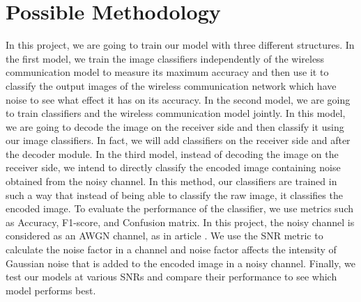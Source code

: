 \documentclass[10pt,twocolumn,letterpaper]{article}
\begin{document}
\section{Possible Methodology}
\label{sec:possiblemethodology}
In this project, we are going to train our model with three different structures. In the first model, we train the image classifiers independently of the wireless communication model to measure its maximum accuracy and then use it to classify the output images of the wireless communication network which have noise to see what effect it has on its accuracy. In the second model, we are going to train classifiers and the wireless communication model jointly. In this model, we are going to decode the image on the receiver side and then classify it using our image classifiers. In fact, we will add classifiers on the receiver side and after the decoder module. In the third model, instead of decoding the image on the receiver side, we intend to directly classify the encoded image containing noise obtained from the noisy channel. In this method, our classifiers are trained in such a way that instead of being able to classify the raw image, it classifies the encoded image. To evaluate the performance of the classifier, we use metrics such as Accuracy, F1-score, and Confusion matrix. In this project, the noisy channel is considered as an AWGN channel, as in article \cite{Alpher07}. We use the SNR metric to calculate the noise factor in a channel and noise factor affects the intensity of Gaussian noise that is added to the encoded image in a noisy channel. Finally, we test our models at various SNRs and compare their performance to see which model performs best.
{\small


}
\end{document}
